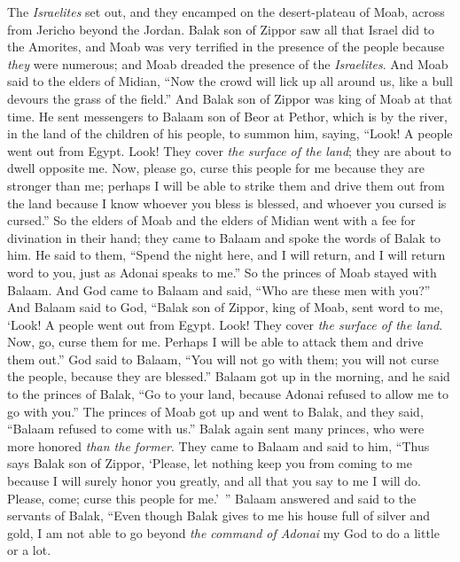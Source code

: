 \begin{biblechapter} %
 The \textit{Israelites} set out, and they encamped on the desert-plateau of Moab, across from Jericho beyond the Jordan.
\verse Balak son of Zippor saw all that Israel did to the Amorites,
\verse and Moab was very terrified in the presence of the people because \textit{they} were numerous; and Moab dreaded the presence of the \textit{Israelites}.
\verse And Moab said to the elders of Midian, “Now the crowd will lick up all around us, like a bull devours the grass of the field.” And Balak son of Zippor was king of Moab at that time.
\verse He sent messengers to Balaam son of Beor at Pethor, which is by the river, in the land of the children of his people, to summon him, saying, “Look! A people went out from Egypt. Look! They cover \textit{the surface of the land}; they are about to dwell opposite me.
\verse Now, please go, curse this people for me because they are stronger than me; perhaps I will be able to strike them and drive them out from the land because I know whoever you bless is blessed, and whoever you cursed is cursed.”
\verse So the elders of Moab and the elders of Midian went with a fee for divination in their hand; they came to Balaam and spoke the words of Balak to him.
\verse He said to them, “Spend the night here, and I will return, and I will return word to you, just as Adonai speaks to me.” So the princes of Moab stayed with Balaam.
\verse And God came to Balaam and said, “Who are these men with you?”
\verse And Balaam said to God, “Balak son of Zippor, king of Moab, sent word to me,
\verse ‘Look! A people went out from Egypt. Look! They cover \textit{the surface of the land}. Now, go, curse them for me. Perhaps I will be able to attack them and drive them out.”
\verse God said to Balaam, “You will not go with them; you will not curse the people, because they are blessed.”
\verse Balaam got up in the morning, and he said to the princes of Balak, “Go to your land, because Adonai refused to allow me to go with you.”
\verse The princes of Moab got up and went to Balak, and they said, “Balaam refused to come with us.”
\verse Balak again sent many princes, who were more honored \textit{than the former}.
\verse They came to Balaam and said to him, “Thus says Balak son of Zippor, ‘Please, let nothing keep you from coming to me
\verse because I will surely honor you greatly, and all that you say to me I will do. Please, come; curse this people for me.’ ”
\verse Balaam answered and said to the servants of Balak, “Even though Balak gives to me his house full of silver and gold, I am not able to go beyond \textit{the command of Adonai} my God to do a little or a lot.

\end{biblechapter}
